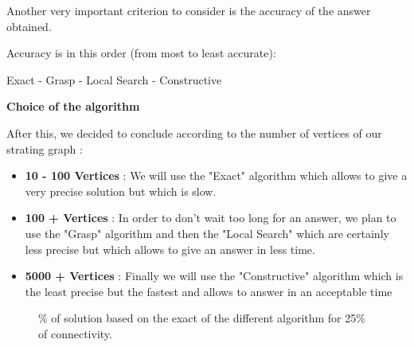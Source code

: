 Another very important criterion to consider is the accuracy of the answer obtained. \bigskip 

Accuracy is in this order (from most to least accurate):

Exact - Grasp - Local Search - Constructive \bigskip 

\large\textbf{Choice of the algorithm} \newline

After this, we decided to conclude according to the number of vertices of our strating graph :

\begin{itemize}
    \item \textbf{10 - 100 Vertices} : We will use the "Exact" algorithm which allows to give a very precise solution but which is slow.

    \item \textbf{100 + Vertices} : In order to don't wait too long for an answer, we plan to use the "Grasp" algorithm and then the "Local Search" which are certainly less precise but which allows to give an answer in less time.

    \item \textbf{5000 + Vertices} : Finally we will use the "Constructive" algorithm which is the least precise but the fastest and allows to answer in an acceptable time

\end{itemize}

\begin{figure}[H]
    \centering
    \caption{\% of solution based on the exact of the different algorithm for 25\% of connectivity.}
    \label{fig:algorithm_25_time}
\end{figure}

